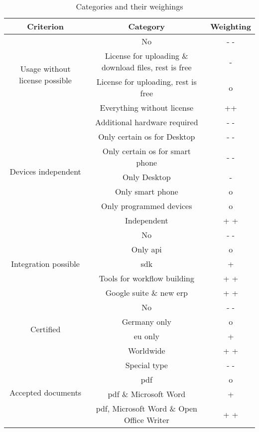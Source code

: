 \begin{table}[h]
	\begin{tabular}{|c|c|c|} \hline
		Criterion & Category & Weighting \\ \hline
		\multirow{4}{*}{Usage without license possible} & No & - - \\ \cline{2-3}
														& License for uploading \& download files, rest is free & - \\ \cline{2-3}
														& License for uploading, rest is free & o \\ \cline{2-3}
														& Everything without license & ++ \\ \hline
		\multirow{7}{*}{Devices independent} & Additional hardware required & - - \\ \cline{2-3}
											 & Only certain \gls{os} for Desktop & - - \\ \cline{2-3}
											 & Only certain \gls{os} for smart phone & - - \\ \cline{2-3} 
											 & Only Desktop & - \\ \cline{2-3}
											 & Only smart phone & o \\ \cline{2-3}
											 & Only programmed devices & o \\ \cline{2-3}
											 & Independent & + + \\ \hline
		\multirow{5}{*}{Integration possible} & No & - - \\ \cline{2-3}
												& Only \gls{api} & o\\ \cline{2-3}
												& \Gls{sdk} & + \\ \cline{2-3}
												& Tools for workflow building & + + \\ \cline{2-3}
												& Google suite \& new \gls{erp} & + + \\ \hline
		\multirow{4}{*}{Certified} & No & - - \\ \cline{2-3}
									& Germany only & o \\ \cline{2-3}
									& \Gls{eu} only & + \\ \cline{2-3}
									& Worldwide & + + \\ \hline
		\multirow{4}{*}{Accepted documents} & Special type & - - \\ \cline{2-3}
											& \Gls{pdf} & o \\ \cline{2-3}
											& \Gls{pdf} \& Microsoft Word & + \\ \cline{2-3}
											& \Gls{pdf}, Microsoft Word \& Open Office Writer & + + \\ \hline

	\end{tabular}
	\caption{Categories and their weighings}
	\label{tab:resTcateg}
\end{table}
